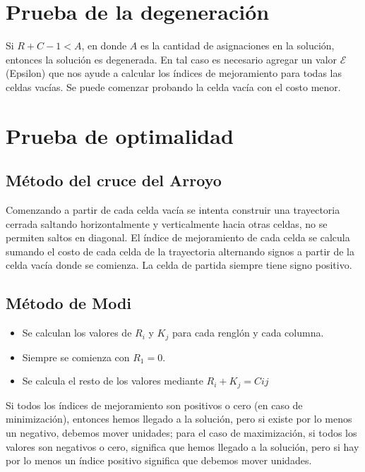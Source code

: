 	\section{Prueba de la degeneración}
	
	Si $R+C-1 < A$, en donde $A$ es la cantidad de asignaciones en la solución, entonces la solución es degenerada. En tal caso es necesario agregar un valor $\mathcal{E}$ (Epsilon) que nos ayude a calcular los índices de mejoramiento para todas las celdas vacías. Se puede comenzar probando la celda vacía con el costo menor.

	\section{Prueba de optimalidad}
	
	\subsection{Método del cruce del Arroyo}
	Comenzando a partir de cada celda vacía se intenta construir una trayectoria cerrada saltando horizontalmente y verticalmente hacia otras celdas, no se permiten saltos en diagonal. El índice de mejoramiento de cada celda se calcula sumando el costo de cada celda de la trayectoria alternando signos a partir de la celda vacía donde se comienza. La celda de partida siempre tiene signo positivo.
	
	\subsection{Método de Modi}
	
	\begin{itemize}
		\item Se calculan los valores de $R_{i}$ y $K_{j}$ para cada renglón y cada columna.
		\item Siempre se comienza con $R_ {1}=0$.
		\item Se calcula el resto de los valores mediante $R_{i}+K_{j}=C{ij}$
	\end{itemize}
	
	Si todos los índices de mejoramiento son positivos o cero (en caso de minimización), entonces hemos llegado a la solución, pero si existe por lo menos un negativo, debemos mover unidades; para el caso de maximización, si todos los valores son negativos o cero, significa que hemos llegado a la solución, pero si hay por lo menos un índice positivo significa que debemos mover unidades.
	
